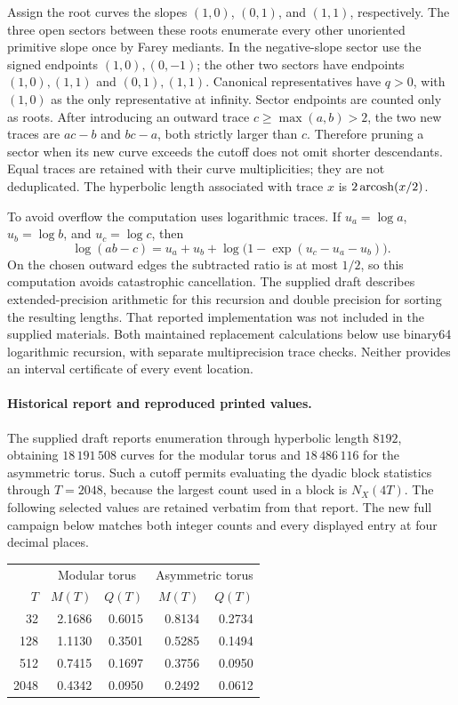 Assign the root curves the slopes $(1,0)$, $(0,1)$, and $(1,1)$,
respectively. The three open sectors between these roots enumerate
every other unoriented primitive slope once by Farey mediants. In the
negative-slope sector use the signed endpoints $(1,0),(0,-1)$;
the other two sectors have endpoints $(1,0),(1,1)$ and
$(0,1),(1,1)$. Canonical representatives have $q>0$, with $(1,0)$
as the only representative at infinity. Sector endpoints are counted
only as roots. After introducing an outward
trace $c\ge\max(a,b)>2$, the two new traces are $ac-b$ and $bc-a$,
both strictly larger than $c$. Therefore pruning a sector when its new
curve exceeds the cutoff does not omit shorter descendants. Equal traces
are retained with their curve multiplicities; they are not deduplicated.
The hyperbolic length associated with trace $x$ is $2\operatorname{arcosh}(x/2)$.

To avoid overflow the computation uses logarithmic traces. If
$u_a=\log a$, $u_b=\log b$, and $u_c=\log c$, then
\[
 \log(ab-c)=u_a+u_b+
        \log\bigl(1-\exp(u_c-u_a-u_b)\bigr).
\]
On the chosen outward edges the subtracted ratio is at most $1/2$,
so this computation avoids catastrophic cancellation. The supplied draft
describes extended-precision arithmetic for this recursion and double
precision for sorting the resulting lengths. That reported implementation
was not included in the supplied materials. Both maintained replacement
calculations below use binary64 logarithmic recursion, with separate
multiprecision trace checks. Neither provides an interval certificate
of every event location.

\paragraph{Historical report and reproduced printed values.}
The supplied draft reports enumeration through hyperbolic length $8192$, obtaining
$18\,191\,508$ curves for the modular torus and $18\,486\,116$ for
the asymmetric torus. Such a cutoff permits evaluating the dyadic block statistics
through $T=2048$, because the largest count used in a block is $N_X(4T)$.
The following selected values are retained verbatim from that report.
The new full campaign below matches both integer counts and every
displayed entry at four decimal places.

\begin{center}
\begin{tabular}{r r r r r}
\toprule
&\multicolumn{2}{c}{Modular torus}&\multicolumn{2}{c}{Asymmetric torus}\\
$T$&$M(T)$&$Q(T)$&$M(T)$&$Q(T)$\\
\midrule
32 & 2.1686 & 0.6015 & 0.8134 & 0.2734 \\
128 & 1.1130 & 0.3501 & 0.5285 & 0.1494 \\
512 & 0.7415 & 0.1697 & 0.3756 & 0.0950 \\
2048 & 0.4342 & 0.0950 & 0.2492 & 0.0612 \\
\bottomrule
\end{tabular}
\end{center}

